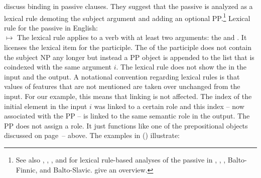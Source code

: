 \documentclass[output=paper
 	        ,biblatex
                ,babelshorthands
                ,newtxmath
                ,draftmode
                ,colorlinks, citecolor=brown
]{langscibook}
\begin{document}

\citet{MS98a} discuss binding in passive clauses. They suggest that the passive is analyzed as a
lexical rule demoting the subject argument and adding an optional PP.\footnote{
  See also , , , and  for lexical rule-based analyses of the
  passive in 
, , , Balto-Finnic, and Balto-Slavic.  give an overview.
} 
\ea
Lexical rule for the passive in English:\\
$\mapsto$
\z
The lexical rule applies to a verb with at least two arguments: the \NPi and . It licenses
the lexical item for the participle. The \argstl of the participle does not contain the subject NP
any longer but instead a PP object is appended to the list that is coindexed with the same argument $i$. 
The lexical rule does not show the \contv in the input and the output. A notational convention
regarding lexical rules is that values of features that are not mentioned are taken over unchanged
from the input. For our example, this means that linking is not affected. The index of the initial
element in the input $i$ was linked to a certain role and this index -- now associated with the PP
-- is linked to the same semantic role in the output. The PP does not assign a role. It just
functions like one of the prepositional objects discussed on
page~\pageref{binding:page-prepositional-objects-start}--\pageref{binding:page-prepositional-objects-end}
above. The examples in () illustrate:
\end{document}
